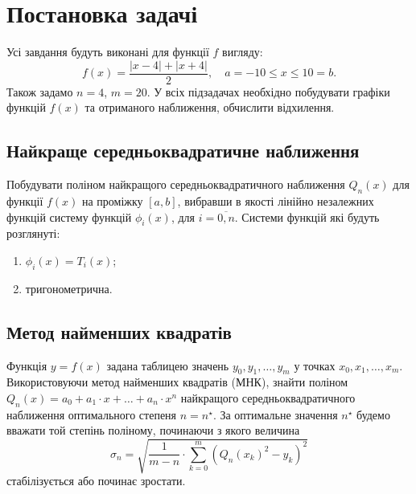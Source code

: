 





\section{Постановка задачі}

Усі завдання будуть виконані для функції $f$ вигляду: \[ f(x) = \frac{|x - 4| + |x + 4|}{2}, \quad a = -10 \le x \le 10 = b. \] Також задамо $n = 4$, $m = 20$. У всіх підзадачах необхідно побудувати графіки функцій $f(x)$ та отриманого наближення, обчислити відхилення.

\subsection{Найкраще середньоквадратичне наближення}

Побудувати поліном найкращого середньоквадратичного наближення $Q_n(x)$ для функції $f(x)$ на проміжку $[a, b]$, вибравши в якості лінійно незалежних функцій систему функцій $\phi_i(x)$, для $i=\overline{0,n}$. Системи функцій які будуть розглянуті:
\begin{enumerate}
    \item $\phi_i(x) = T_i(x)$;
    \item тригонометрична.
\end{enumerate}

\subsection{Метод найменших квадратів}

Функція $y = f(x)$ задана таблицею значень $y_0, y_1, \ldots, y_m$ у точках $x_0, x_1, \ldots, x_m$. Використовуючи метод найменших квадратів (МНК), знайти поліном $Q_n(x) = a_0 + a_1 \cdot x + \ldots + a_n \cdot x^n$ найкращого середньоквадратичного наближення оптимального степеня $n = n^\star$. За оптимальне значення $n^\star$ будемо вважати той степінь поліному, починаючи з якого величина \[ \sigma_n = \sqrt{\frac{1}{m - n} \cdot \sum_{k = 0}^m (Q_n(x_k)^2 - y_k)^2} \] стабілізується або починає зростати.

